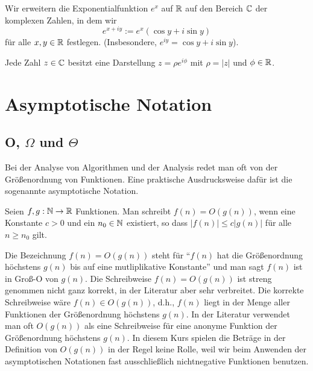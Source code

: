 \begin{defn}
	Wir erweitern die Exponentialfunktion $e^x$ auf $\mathbb{R}$ auf den Bereich $\mathbb{C}$ der komplexen Zahlen, in dem wir 
	\[
		e^{x+ i y} := e^x ( \cos y + i \sin y)
	\]
	für alle $x, y \in \mathbb{R}$ festlegen. (Insbesondere, $e^{i y} = \cos y + i \sin y$). 
\end{defn} 

\begin{bem}
	Jede Zahl $z \in \mathbb{C}$ besitzt eine Darstellung $z = \rho e^{i \phi}$ mit $\rho = |z|$ und $\phi \in \mathbb{R}$. 
\end{bem} 

\section{Asymptotische Notation}

\subsection{O, $\Omega$ und $\Theta$}

\begin{bem}
Bei der Analyse von Algorithmen und der Analysis redet man oft von der Größenordnung von Funktionen. Eine praktische Ausdrucksweise dafür ist die sogenannte asymptotische Notation.
\end{bem} 

\begin{defn}[$O$-Notation]  
Seien $f, g: \mathbb{N} \to \mathbb{R}$ Funktionen. 
Man schreibt $f(n) = O(g(n))$, wenn eine Konstante $c>0$ und ein $n_0 \in \mathbb{N}$ existiert, so dass $|f(n)| \le c |g(n)|$ für alle $n \ge n_0$ gilt. 
\end{defn} 

\begin{bem} 
Die Bezeichnung $f(n)=O(g(n))$ steht für ``$f(n)$ hat die Größenordnung höchstens $g(n)$ bis auf eine mutliplikative Konstante'' und man sagt \glqq$f(n)$ ist in Groß-O von $g(n)$\grqq. Die Schreibweise $f(n) = O(g(n))$ ist streng genommen nicht ganz korrekt, in der Literatur aber sehr verbreitet. Die korrekte Schreibweise wäre $f(n) \in O(g(n))$, d.h., $f(n)$ liegt in der Menge aller Funktionen der Größenordnung höchstens $g(n)$. In der Literatur verwendet man oft $O(g(n))$ als eine Schreibweise für eine anonyme Funktion der Größenordnung höchstens $g(n)$. In diesem Kurs spielen die Beträge in der Definition von $O(g(n))$ in der Regel keine Rolle, weil wir beim Anwenden der asymptotischen Notationen fast ausschließlich nichtnegative Funktionen benutzen. 
\end{bem} 

